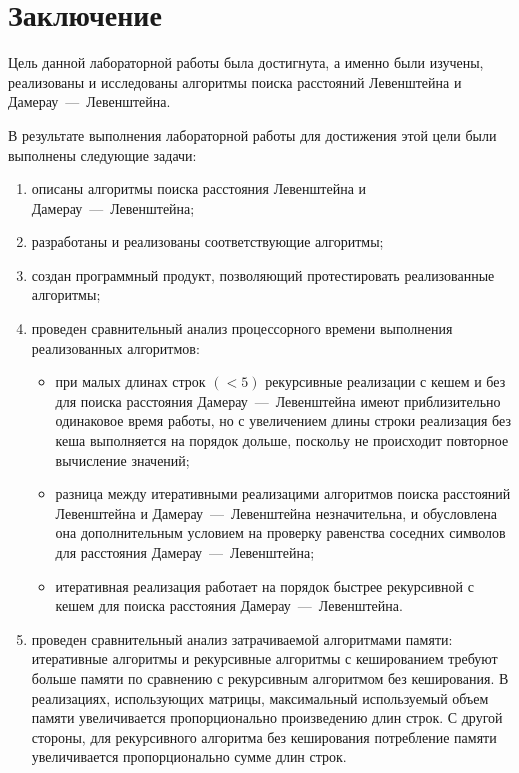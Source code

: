 \chapter*{Заключение}

Цель данной лабораторной работы была достигнута, а именно были изучены, реализованы и исследованы алгоритмы поиска расстояний Левенштейна и Дамерау~---~Левенштейна.

В результате выполнения лабораторной работы для достижения этой цели были выполнены следующие задачи:
\begin{enumerate}
    \item описаны алгоритмы поиска расстояния Левенштейна и Дамерау~---~Левенштейна;
    \item разработаны и реализованы соответствующие алгоритмы;
    \item создан программный продукт, позволяющий протестировать реализованные алгоритмы;
    \item проведен сравнительный анализ процессорного времени выполнения реализованных алгоритмов:
    \begin{itemize}
        \item при малых длинах строк $(< 5)$ рекурсивные реализации с кешем и без для поиска расстояния Дамерау~---~Левенштейна имеют приблизительно одинаковое время работы, 
	но с увеличением длины строки реализация без кеша выполняется на порядок дольше, поскольу не происходит повторное вычисление значений;
	\item разница между итеративными реализацими алгоритмов поиска расстояний Левенштейна и Дамерау~---~Левенштейна незначительна, и обусловлена она
	дополнительным условием на проверку равенства соседних символов для расстояния Дамерау~---~Левенштейна;
	\item итеративная реализация работает на порядок быстрее рекурсивной с кешем для поиска расстояния Дамерау~---~Левенштейна.
    \end{itemize}
    \item проведен сравнительный анализ затрачиваемой алгоритмами памяти: итеративные алгоритмы и рекурсивные алгоритмы с кешированием требуют больше памяти по сравнению с рекурсивным алгоритмом без кеширования. 
    В реализациях, использующих матрицы, максимальный используемый объем памяти увеличивается пропорционально произведению длин строк. С другой стороны, для рекурсивного алгоритма без кеширования потребление памяти 
    увеличивается пропорционально сумме длин строк.
\end{enumerate}